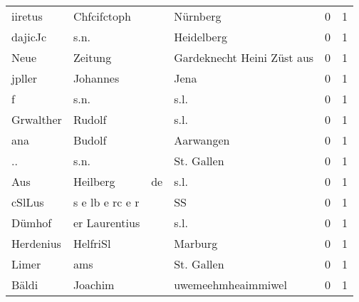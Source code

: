 \begin{tabular}{llllrr}
                  iiretus &                        Chfcifctoph &             &                                    Nürnberg &          0 &         1 \\
                  dajicJc &                               s.n. &             &                                  Heidelberg &          0 &         1 \\
                     Neue &                            Zeitung &             &                  Gardeknecht Heini Züst aus &          0 &         1 \\
                   jpller &                           Johannes &             &                                        Jena &          0 &         1 \\
                        f &                               s.n. &             &                                        s.l. &          0 &         1 \\
                Grwalther &                             Rudolf &             &                                        s.l. &          0 &         1 \\
                      ana &                             Budolf &             &                                   Aarwangen &          0 &         1 \\
                       .. &                               s.n. &             &                                  St. Gallen &          0 &         1 \\
                      Aus &                           Heilberg &          de &                                        s.l. &          0 &         1 \\
                   cSlLus &                    s e lb e rc e r &             &                                          SS &          0 &         1 \\
                   Dümhof &                      er Laurentius &             &                                        s.l. &          0 &         1 \\
                Herdenius &                           HelfriSl &             &                                     Marburg &          0 &         1 \\
                    Limer &                                ams &             &                                  St. Gallen &          0 &         1 \\
                    Bäldi &                            Joachim &             &                          uwemeehmheaimmiwel &          0 &         1 \\

\end{tabular}
